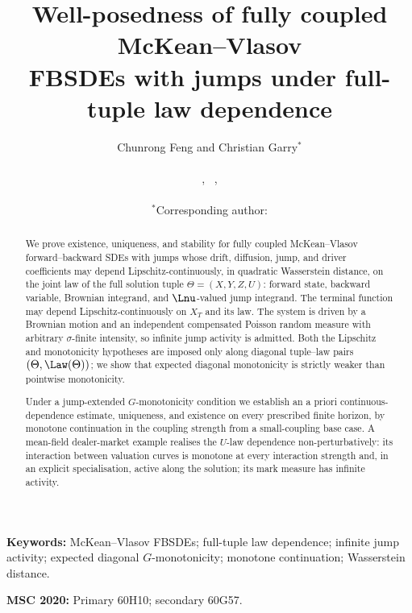 \documentclass[12pt,a4paper]{article}
\title{Well-posedness of fully coupled McKean--Vlasov\\
FBSDEs with jumps under full-tuple law dependence}
\author{Chunrong Feng and Christian Garry$^{*}$\\[4pt]
\small \PaperDept\\[1pt]
\small \PaperStreet, \PaperCity\ \PaperPostcode, \PaperCountry\\[3pt]
\small \texttt{\PaperEmailFeng}\\[1pt]
\small $^{*}$Corresponding author: \texttt{\PaperEmailGarry}}
\date{}
\begin{document}
\maketitle
\begin{abstract}
We prove existence, uniqueness, and stability for fully coupled McKean--Vlasov
forward--backward SDEs with jumps whose drift, diffusion, jump, and driver coefficients
may depend Lipschitz-continuously, in quadratic Wasserstein distance, on the joint law of
the full solution tuple $\Theta=(X,Y,Z,U)$: forward state, backward variable, Brownian
integrand, and $\Lnu$-valued jump integrand. The terminal function may depend
Lipschitz-continuously on $X_T$ and its law. The system is driven by a Brownian motion and an independent compensated Poisson
random measure with arbitrary $\sigma$-finite intensity, so infinite jump activity is
admitted.
Both the Lipschitz and monotonicity hypotheses are imposed only along diagonal
tuple--law pairs $(\Theta,\Law(\Theta))$; we show that expected diagonal monotonicity is
strictly weaker than pointwise monotonicity.

Under a jump-extended $G$-monotonicity condition we
establish an a priori continuous-dependence estimate, uniqueness, and existence on every
prescribed finite horizon, by monotone continuation in the coupling strength from a
small-coupling base case. A mean-field dealer-market example realises the $U$-law
dependence non-perturbatively: its interaction between valuation curves is monotone at
every interaction strength and, in an explicit specialisation, active along the solution;
its mark measure has infinite activity.
\end{abstract}

\smallskip
\noindent\textbf{Keywords:} McKean--Vlasov FBSDEs; full-tuple law dependence; infinite jump activity; expected diagonal $G$-monotonicity; monotone continuation; Wasserstein distance.

\noindent\textbf{MSC 2020:} Primary 60H10; secondary 60G57.









\end{document}
